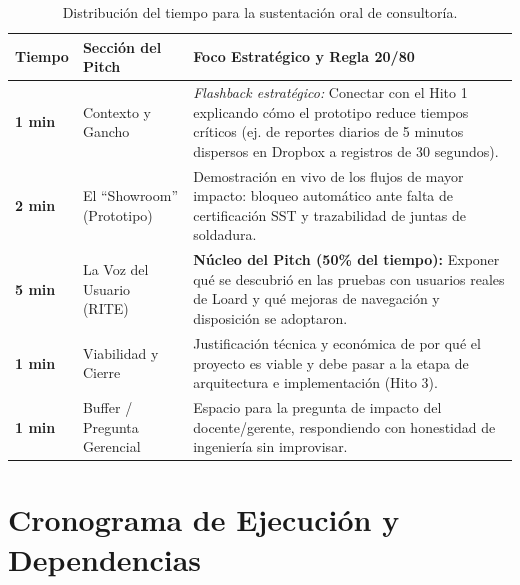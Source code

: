 \documentclass[11pt,letterpaper]{article}
\begin{document}
\begin{table}[H]
\centering
\small
\begin{tabularx}{\textwidth}{@{}l p{4.2cm} X@{}}
\toprule
\rowcolor{docHead}
\textbf{Tiempo} & \textbf{Sección del Pitch} & \textbf{Foco Estratégico y Regla 20/80} \\
\midrule
\textbf{1 min} & Contexto y Gancho & \emph{Flashback estratégico:} Conectar con el Hito 1 explicando cómo el prototipo reduce tiempos críticos (ej. de reportes diarios de 5 minutos dispersos en Dropbox a registros de 30 segundos). \\
\addlinespace
\textbf{2 min} & El ``Showroom'' (Prototipo) & Demostración en vivo de los flujos de mayor impacto: bloqueo automático ante falta de certificación SST y trazabilidad de juntas de soldadura. \\
\addlinespace
\textbf{5 min} & La Voz del Usuario (RITE) & \textbf{Núcleo del Pitch (50\% del tiempo):} Exponer qué se descubrió en las pruebas con usuarios reales de Loard y qué mejoras de navegación y disposición se adoptaron. \\
\addlinespace
\textbf{1 min} & Viabilidad y Cierre & Justificación técnica y económica de por qué el proyecto es viable y debe pasar a la etapa de arquitectura e implementación (Hito 3). \\
\addlinespace
\textbf{1 min} & Buffer / Pregunta Gerencial & Espacio para la pregunta de impacto del docente/gerente, respondiendo con honestidad de ingeniería sin improvisar. \\
\bottomrule
\end{tabularx}
\caption{Distribución del tiempo para la sustentación oral de consultoría.}
\end{table}

\section{Cronograma de Ejecución y Dependencias}
\end{document}

